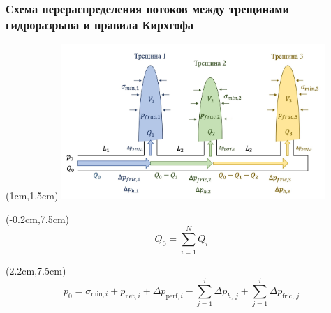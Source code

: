 \documentclass{beamer}
\begin{document}

\begin{frame}
\frametitle{Схема перераспределения потоков между трещинами гидроразрыва и правила Кирхгофа}

\begin{textblock*}{11cm}(1cm,1.5cm)
\includegraphics[width=10cm]{flow_distribution_scheme.jpg}
\end{textblock*}

\begin{textblock*}{4cm}(-0.2cm,7.5cm)
$$\boxed{Q_0=\sum\limits_{i=1}^{N}Q_i}$$
\end{textblock*}

\begin{textblock*}{11cm}(2.2cm,7.5cm)
$$\boxed{p_0=\sigma_{\text{min},i}+p_{\text{net},i}+\Delta p_{\text{perf},i}-\sum_{j=1}^{i}{\Delta p_{h,\,j}}+\sum_{j=1}^{i}\Delta p_{\text{fric},\,j}}$$
\end{textblock*}

\end{frame}
\end{document}
